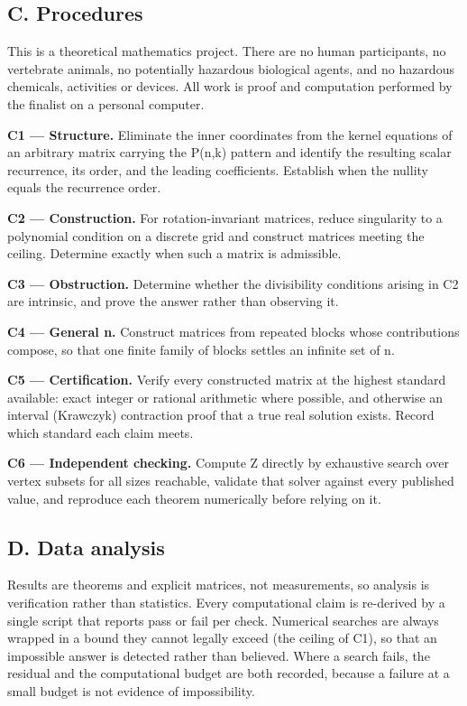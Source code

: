 \documentclass[11pt]{article}
\begin{document}
\subsection*{C. Procedures}

This is a theoretical mathematics project. There are no human participants, no
vertebrate animals, no potentially hazardous biological agents, and no hazardous
chemicals, activities or devices. All work is proof and computation performed by
the finalist on a personal computer.

\textbf{C1 — Structure.} Eliminate the inner coordinates from the kernel equations of
an arbitrary matrix carrying the P(n,k) pattern and identify the resulting scalar
recurrence, its order, and the leading coefficients. Establish when the nullity
equals the recurrence order.

\textbf{C2 — Construction.} For rotation-invariant matrices, reduce singularity to a
polynomial condition on a discrete grid and construct matrices meeting the
ceiling. Determine exactly when such a matrix is admissible.

\textbf{C3 — Obstruction.} Determine whether the divisibility conditions arising in C2
are intrinsic, and prove the answer rather than observing it.

\textbf{C4 — General n.} Construct matrices from repeated blocks whose contributions
compose, so that one finite family of blocks settles an infinite set of n.

\textbf{C5 — Certification.} Verify every constructed matrix at the highest standard
available: exact integer or rational arithmetic where possible, and otherwise an
interval (Krawczyk) contraction proof that a true real solution exists. Record
which standard each claim meets.

\textbf{C6 — Independent checking.} Compute Z directly by exhaustive search over
vertex subsets for all sizes reachable, validate that solver against every
published value, and reproduce each theorem numerically before relying on it.

\subsection*{D. Data analysis}

Results are theorems and explicit matrices, not measurements, so analysis is
verification rather than statistics. Every computational claim is re-derived by a
single script that reports pass or fail per check. Numerical searches are always
wrapped in a bound they cannot legally exceed (the ceiling of C1), so that an
impossible answer is detected rather than believed. Where a search fails, the
residual and the computational budget are both recorded, because a failure at a
small budget is not evidence of impossibility.
\end{document}
